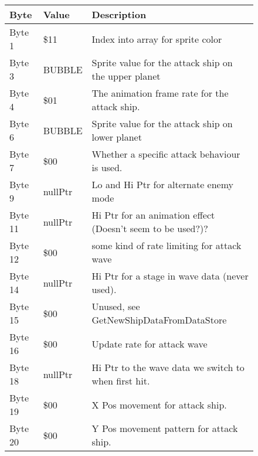 \begin{figure}[H]
  {
  \setlength{\tabcolsep}{3.0pt}
  \setlength\cmidrulewidth{\heavyrulewidth} %
  \begin{adjustbox}{width=12cm}

\begin{tabular}{lll}
\toprule
 Byte    & Value                      & Description                                                        \\
\midrule
 Byte 1  & \$11                        & Index into array for sprite color                                  \\
 Byte 3  & BUBBLE                     & Sprite value for the attack ship on the upper planet               \\
 Byte 4  & \$01                        & The animation frame rate for the attack ship.                      \\
 Byte 6  & BUBBLE                     & Sprite value for the attack ship on lower planet                   \\
 Byte 7  & \$00                        & Whether a specific attack behaviour is used.                       \\
 Byte 9  & nullPtr                    & Lo and Hi Ptr for alternate enemy mode                             \\
 Byte 11 & nullPtr                    & Hi Ptr for an animation effect (Doesn't seem to be used?)?         \\
 Byte 12 & \$00                        & some kind of rate limiting for attack wave                         \\
 Byte 14 & nullPtr                    & Hi Ptr for a stage in wave data (never used).                      \\
 Byte 15 & \$00                        & Unused, see GetNewShipDataFromDataStore                            \\
 Byte 16 & \$00                        & Update rate for attack wave                                        \\
 Byte 18 & nullPtr                    & Hi Ptr to the wave data we switch to when first hit.               \\
 Byte 19 & \$00                        & X Pos movement for attack ship.                                    \\
 Byte 20 & \$00                        & Y Pos movement pattern for attack ship.                            \\

\end{tabular}
\end{adjustbox}}
\end{figure}
